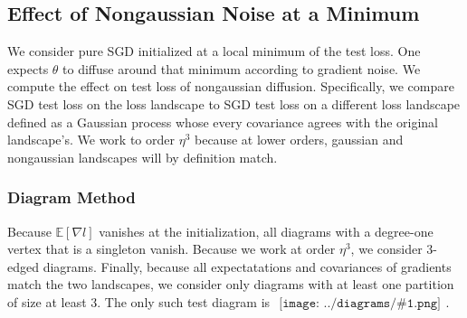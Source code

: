 \documentclass{article}
\newcommand{\expct}[1]{\mathbb{E}\left[#1\right]}
\newcommand{\sdia}[1]{\begin{gathered}\texttt{[image: ../diagrams/\#1.png]}\end{gathered}}
\begin{document}
    \subsection*{Effect of Nongaussian Noise at a Minimum}
        We consider pure SGD initialized at a local minimum of the test loss.
        One expects $\theta$ to diffuse around that minimum according to
        gradient noise.  We compute the effect on test loss of nongaussian
        diffusion.  Specifically, we compare SGD test loss on the loss
        landscape to SGD test loss on a different loss landscape defined as a
        Gaussian process whose every covariance agrees with the original
        landscape's.  We work to order $\eta^3$ because at lower orders,
        gaussian and nongaussian landscapes will by definition match. 

        \subsubsection*{Diagram Method}
            Because $\expct{\nabla l}$ vanishes at the initialization, all
            diagrams with a degree-one vertex that is a singleton vanish.
            Because we work at order $\eta^3$, we consider $3$-edged diagrams.
            Finally, because all expectatations and covariances of gradients
            match the two landscapes, we consider only diagrams with at least
            one partition of size at least $3$.  The only such test diagram is
            $\sdia{(012-3)(03-13-23)}$.
\end{document}
